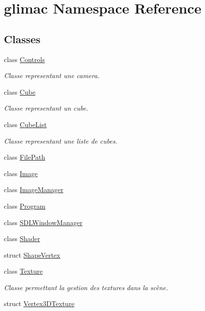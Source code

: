 \hypertarget{namespaceglimac}{}\section{glimac Namespace Reference}
\label{namespaceglimac}
\subsection*{Classes}
\begin{DoxyCompactItemize}
\item 
class \hyperlink{classglimac_1_1Controls}{Controls}
\begin{DoxyCompactList}\small\item\em Classe representant une camera. \end{DoxyCompactList}\item 
class \hyperlink{classglimac_1_1Cube}{Cube}
\begin{DoxyCompactList}\small\item\em Classe representant un cube. \end{DoxyCompactList}\item 
class \hyperlink{classglimac_1_1CubeList}{Cube\+List}
\begin{DoxyCompactList}\small\item\em Classe representant une liste de cubes. \end{DoxyCompactList}\item 
class \hyperlink{classglimac_1_1FilePath}{File\+Path}
\item 
class \hyperlink{classglimac_1_1Image}{Image}
\item 
class \hyperlink{classglimac_1_1ImageManager}{Image\+Manager}
\item 
class \hyperlink{classglimac_1_1Program}{Program}
\item 
class \hyperlink{classglimac_1_1SDLWindowManager}{S\+D\+L\+Window\+Manager}
\item 
class \hyperlink{classglimac_1_1Shader}{Shader}
\item 
struct \hyperlink{structglimac_1_1ShapeVertex}{Shape\+Vertex}
\item 
class \hyperlink{classglimac_1_1Texture}{Texture}
\begin{DoxyCompactList}\small\item\em Classe permettant la gestion des textures dans la scène. \end{DoxyCompactList}\item 
struct \hyperlink{structglimac_1_1Vertex3DTexture}{Vertex3\+D\+Texture}
\end{DoxyCompactItemize}
